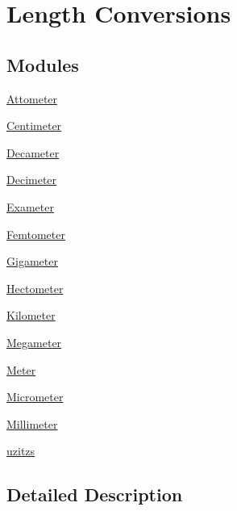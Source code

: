 \hypertarget{group___e_g_x_math-_conversions-_length_conversions}{}\section{Length Conversions}
\label{group___e_g_x_math-_conversions-_length_conversions}
\subsection*{Modules}
\begin{DoxyCompactItemize}
\item 
\mbox{\hyperlink{group___e_g_x_math-_conversions-_length_conversions-_attometer}{Attometer}}
\item 
\mbox{\hyperlink{group___e_g_x_math-_conversions-_length_conversions-_centimeter}{Centimeter}}
\item 
\mbox{\hyperlink{group___e_g_x_math-_conversions-_length_conversions-_decameter}{Decameter}}
\item 
\mbox{\hyperlink{group___e_g_x_math-_conversions-_length_conversions-_decimeter}{Decimeter}}
\item 
\mbox{\hyperlink{group___e_g_x_math-_conversions-_length_conversions-_exameter}{Exameter}}
\item 
\mbox{\hyperlink{group___e_g_x_math-_conversions-_length_conversions-_femtometer}{Femtometer}}
\item 
\mbox{\hyperlink{group___e_g_x_math-_conversions-_length_conversions-_gigameter}{Gigameter}}
\item 
\mbox{\hyperlink{group___e_g_x_math-_conversions-_length_conversions-_hectometer}{Hectometer}}
\item 
\mbox{\hyperlink{group___e_g_x_math-_conversions-_length_conversions-_kilometer}{Kilometer}}
\item 
\mbox{\hyperlink{group___e_g_x_math-_conversions-_length_conversions-_megameter}{Megameter}}
\item 
\mbox{\hyperlink{group___e_g_x_math-_conversions-_length_conversions-_meter}{Meter}}
\item 
\mbox{\hyperlink{group___e_g_x_math-_conversions-_length_conversions-_micrometer}{Micrometer}}
\item 
\mbox{\hyperlink{group___e_g_x_math-_conversions-_length_conversions-_millimeter}{Millimeter}}
\item 
\mbox{\hyperlink{group___e_g_x_math-_conversions-_length_conversions-uzitzs}{uzitzs}}
\end{DoxyCompactItemize}


\subsection{Detailed Description}
